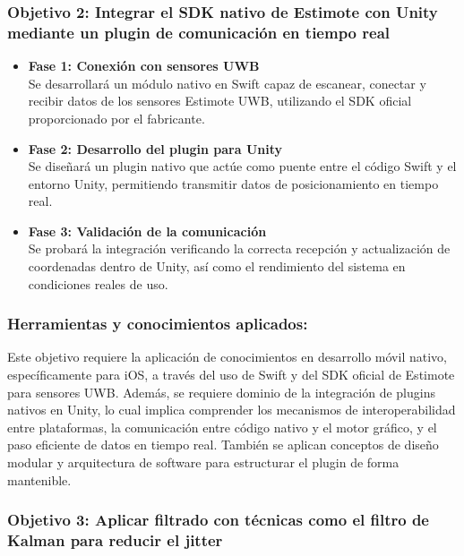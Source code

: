 \documentclass{article}
\begin{document}
\subsubsection{Objetivo 2: Integrar el SDK nativo de Estimote con Unity mediante un plugin de comunicación en tiempo real}

\begin{itemize}
    \item \textbf{Fase 1: Conexión con sensores UWB} \\
    Se desarrollará un módulo nativo en Swift capaz de escanear, conectar y recibir datos de los sensores Estimote UWB, utilizando el SDK oficial proporcionado por el fabricante.

    \item \textbf{Fase 2: Desarrollo del plugin para Unity} \\
    Se diseñará un plugin nativo que actúe como puente entre el código Swift y el entorno Unity, permitiendo transmitir datos de posicionamiento en tiempo real.

    \item \textbf{Fase 3: Validación de la comunicación} \\
    Se probará la integración verificando la correcta recepción y actualización de coordenadas dentro de Unity, así como el rendimiento del sistema en condiciones reales de uso.
\end{itemize}

\subsubsection{Herramientas y conocimientos aplicados:} 
{\justify Este objetivo requiere la aplicación de conocimientos en desarrollo móvil nativo, específicamente para iOS, a través del uso de Swift y del SDK oficial de Estimote para sensores UWB. Además, se requiere dominio de la integración de plugins nativos en Unity, lo cual implica comprender los mecanismos de interoperabilidad entre plataformas, la comunicación entre código nativo y el motor gráfico, y el paso eficiente de datos en tiempo real. También se aplican conceptos de diseño modular y arquitectura de software para estructurar el plugin de forma mantenible.}

\subsubsection{Objetivo 3: Aplicar filtrado con técnicas como el filtro de Kalman para reducir el jitter}
\end{document}
